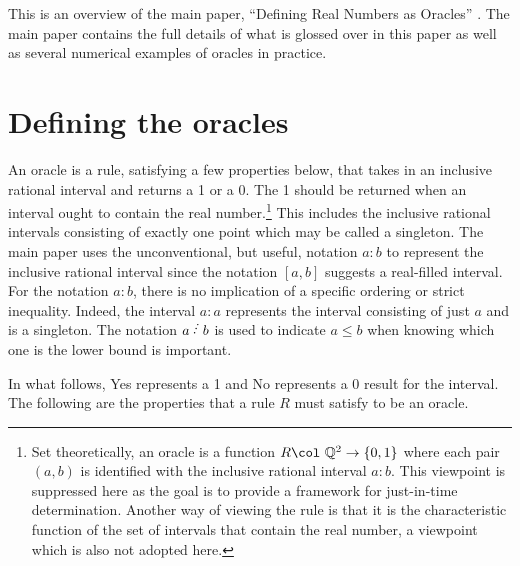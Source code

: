 \documentclass[12pt]{article}
\begin{document}
This is an overview of the main paper, ``Defining Real Numbers as Oracles'' \cite{taylor23main}. The main paper contains the full details of what is glossed over in this paper as well as several numerical examples of oracles in practice. 

\section{Defining the oracles}\label{sec:ora}

An oracle is a rule, satisfying a few properties below, that takes in an inclusive rational interval and returns a 1 or a 0. The 1 should be returned when an interval ought to contain the real number.\footnote{Set theoretically, an oracle is a function $R \col \ \mathbb{Q}^2 \to \{0,1\}$ where each pair $(a,b)$ is identified with the inclusive rational interval $a:b$. This viewpoint is suppressed here as the goal is to provide a framework for just-in-time determination. Another way of viewing the rule is that it is the characteristic function of the set of intervals that contain the real number, a viewpoint which is also not adopted here.} This includes the inclusive rational intervals consisting of exactly one point which may be called a singleton. The main paper uses the unconventional, but useful, notation $a:b$ to represent the inclusive rational interval since the notation $[a,b]$ suggests a real-filled interval. For the notation $a:b$, there is no implication of a specific ordering or strict inequality.  Indeed, the  interval $a:a$ represents the interval consisting of just $a$ and is a singleton. The notation $a\lte b$ is used to indicate $a\leq b$ when knowing which one is the lower bound is important. 

In what follows, Yes represents a 1 and No represents a 0 result for the interval. The following are the properties that a rule $R$ must satisfy to be an oracle. 
\end{document}
